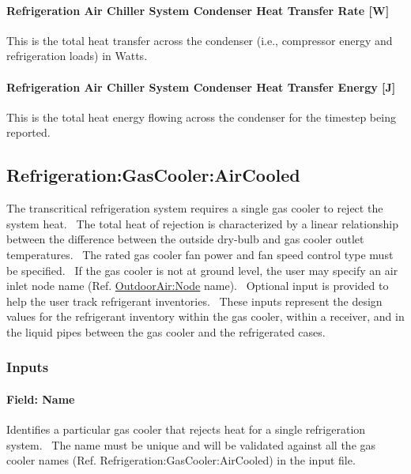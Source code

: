 \paragraph{Refrigeration Air Chiller System Condenser Heat Transfer Rate {[}W{]}}\label{refrigeration-air-chiller-system-condenser-heat-transfer-rate-w-3}

This is the total heat transfer across the condenser (i.e., compressor energy and refrigeration loads) in Watts.

\paragraph{Refrigeration Air Chiller System Condenser Heat Transfer Energy {[}J{]}}\label{refrigeration-air-chiller-system-condenser-heat-transfer-energy-j-3}

This is the total heat energy flowing across the condenser for the timestep being reported.

\subsection{Refrigeration:GasCooler:AirCooled}\label{refrigerationgascooleraircooled}

The transcritical refrigeration system requires a single gas cooler to reject the system heat.~ The total heat of rejection is characterized by a linear relationship between the difference between the outside dry-bulb and gas cooler outlet temperatures.~ The rated gas cooler fan power and fan speed control type must be specified.~ If the gas cooler is not at ground level, the user may specify an air inlet node name (Ref. \hyperref[outdoorairnode]{OutdoorAir:Node} name).~ Optional input is provided to help the user track refrigerant inventories.~ These inputs represent the design values for the refrigerant inventory within the gas cooler, within a receiver, and in the liquid pipes between the gas cooler and the refrigerated cases.

\subsubsection{Inputs}\label{inputs-12-013}

\paragraph{Field: Name}\label{field-name-13-008}

Identifies a particular gas cooler that rejects heat for a single refrigeration system.~ The name must be unique and will be validated against all the gas cooler names (Ref. Refrigeration:GasCooler:AirCooled) in the input file.

